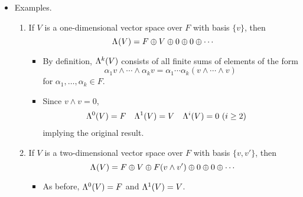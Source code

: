 \documentclass[../notes.tex]{subfiles}
\begin{document}
\begin{itemize}
\begin{theorem}
\begin{enumerate}
            \item (Universal Property for Alternating Multilinear Maps) If $\varphi:M\times\cdots\times M\to N$ is an alternating $k$-multilinear map, then there is a unique $R$-module homomorphism $\Phi:\lam[k]{M}\to N$ such that $\varphi=\Phi\circ\iota$, where $\iota:M\times\cdots\times M\to\lam[k]{M}$ is the map defined by
            \begin{equation*}
                (m_1,\dots,m_k) \mapsto m_1\wedge\cdots\wedge m_k
            \end{equation*}
        \end{enumerate}
        \begin{proof}
            Given.
        \end{proof}
    \end{theorem}
    \item Examples.
    \begin{enumerate}
        \item If $V$ is a one-dimensional vector space over $F$ with basis $\{v\}$, then
        \begin{equation*}
            \lam{V} = F\oplus V\oplus 0\oplus 0\oplus\cdots
        \end{equation*}
        \begin{itemize}
            \item By definition, $\lam[k]{V}$ consists of all finite sums of elements of the form
            \begin{equation*}
                \alpha_1v\wedge\cdots\wedge\alpha_kv = \alpha_1\cdots\alpha_k(v\wedge\cdots\wedge v)
            \end{equation*}
            for $\alpha_1,\dots,\alpha_k\in F$.
            \item Since $v\wedge v=0$,
            \begin{align*}
                \lam[0]{V} &= F&
                \lam[1]{V} &= V&
                \lam[i]{V} &= 0\ (i\geq 2)
            \end{align*}
            implying the original result.
        \end{itemize}
        \item If $V$ is a two-dimensional vector space over $F$ with basis $\{v,v'\}$, then
        \begin{equation*}
            \lam{V} = F\oplus V\oplus F(v\wedge v')\oplus 0\oplus 0\oplus\cdots
        \end{equation*}
        \begin{itemize}
            \item As before, $\lam[0]{V}=F$ and $\lam[1]{V}=V$.

\end{itemize}
\end{enumerate}
\end{itemize}
\end{document}
